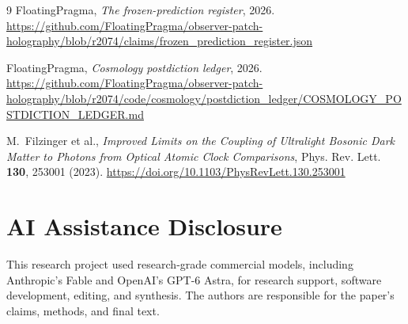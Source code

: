 \documentclass[11pt]{article}
\theoremstyle{remark}
\begin{document}
\begin{thebibliography}{9}
FloatingPragma,
\emph{The frozen-prediction register}, 2026.
\url{https://github.com/FloatingPragma/observer-patch-holography/blob/r2074/claims/frozen_prediction_register.json}

FloatingPragma,
\emph{Cosmology postdiction ledger}, 2026.
\url{https://github.com/FloatingPragma/observer-patch-holography/blob/r2074/code/cosmology/postdiction_ledger/COSMOLOGY_POSTDICTION_LEDGER.md}

M.~Filzinger et al.,
\emph{Improved Limits on the Coupling of Ultralight Bosonic Dark Matter to
Photons from Optical Atomic Clock Comparisons},
Phys. Rev. Lett. \textbf{130}, 253001 (2023).
\url{https://doi.org/10.1103/PhysRevLett.130.253001}

\end{thebibliography}

\section*{AI Assistance Disclosure}
This research project used research-grade commercial models, including
Anthropic's Fable and OpenAI's GPT-6 Astra, for research support, software
development, editing, and synthesis. The authors are responsible for the
paper's claims, methods, and final text.
\end{document}
